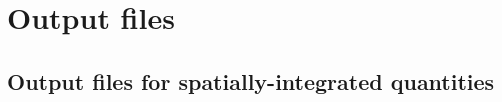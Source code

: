 \documentclass[letterpaper]{article}
\begin{document}

\newpage
\section{Output files}

\subsection{Output files for spatially-integrated quantities}
\end{document}
